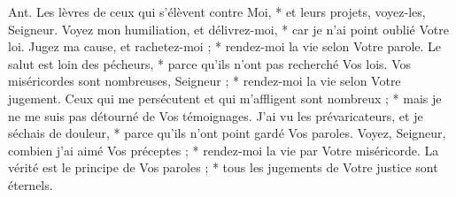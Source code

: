 Ant. Les lèvres de ceux qui s’élèvent contre Moi, * et leurs projets, voyez-les, Seigneur.
\versseparator
Voyez mon humiliation, et délivrez-moi, * car je n'ai point oublié Votre loi.
\versseparator
Jugez ma cause, et rachetez-moi ; * rendez-moi la vie selon Votre parole.
\versseparator
Le salut est loin des pécheurs, * parce qu'ils n'ont pas recherché Vos lois.
\versseparator
Vos miséricordes sont nombreuses, Seigneur ; * rendez-moi la vie selon Votre jugement.
\versseparator
Ceux qui me persécutent et qui m'affligent sont nombreux ; * mais je ne me suis pas détourné de Vos témoignages.
\versseparator
J'ai vu les prévaricateurs, et je séchais de douleur, * parce qu'ils n'ont point gardé Vos paroles.
\versseparator
Voyez, Seigneur, combien j'ai aimé Vos préceptes ; * rendez-moi la vie par Votre miséricorde.
\versseparator
La vérité est le principe de Vos paroles ; * tous les jugements de Votre justice sont éternels.